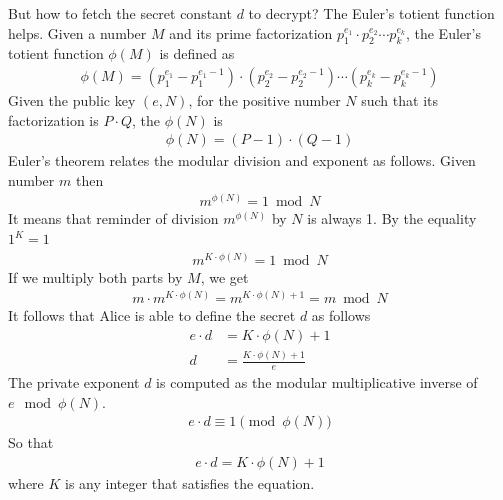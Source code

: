 But how to fetch the secret constant $d$ to decrypt?
The Euler's totient function helps.
Given a number $M$ and its prime factorization $p_1^{e_1}\cdot p_2^{e_2} \cdots p_k^{e_k}$, the Euler's totient function
$\phi(M)$ is defined as
\begin{align*}
    \phi(M) = (p_1^{e_1} - p_1^{e_1 - 1}) \cdot (p_2^{e_2} - p_2^{e_2 - 1}) \cdots (p_k^{e_k} - p_k^{e_k - 1})
\end{align*}
Given the public key $(e, N)$, for the positive number $N$ such that its factorization is $P \cdot Q$, the $\phi(N)$ is
\begin{align*}
    \phi(N) = (P - 1) \cdot (Q - 1)
\end{align*}
Euler's theorem relates the modular division and exponent as follows.
Given number $m$ then
\begin{align*}
    m^{\phi(N)} = 1 \bmod N
\end{align*}
It means that reminder of division $m^{\phi(N)}$ by $N$ is always 1.
By the equality $1^K = 1$
\begin{align*}
    m^{K \cdot \phi(N)} = 1 \bmod N
\end{align*}
If we multiply both parts by $M$, we get
\begin{align*}
    m \cdot m^{K \cdot \phi(N)} = m^{K \cdot \phi(N) + 1} = m \bmod N
\end{align*}
It follows that Alice is able to define the secret $d$ as follows
\begin{align*}
    e \cdot d &= K \cdot \phi(N) + 1 \\
    d         &= \frac{K \cdot \phi(N) + 1}{e}
\end{align*}
The private exponent \(d\) is computed as the modular multiplicative inverse of \(e \mod \phi(N)\).
\begin{align*}
    e \cdot d \equiv 1 \pmod{\phi(N)}
\end{align*}
So that
\begin{align*}
    e \cdot d = K \cdot \phi(N) + 1
\end{align*}
where $K$ is any integer that satisfies the equation.

